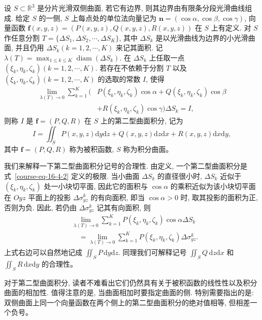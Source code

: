 \documentclass[12pt,fontset=fandol]{ctexart}
\begin{document}
\begin{definition}\label{course-definition-16-4-2}\quad 设 $S\subset\mathbb R^3$ 是分片光滑双侧曲面, 若它有边界, 则其边界由有限条分段光滑曲线组成. 给定 $S$ 的一侧, $S$ 上每点处的单位法向量记为 $\boldsymbol n=(\cos\alpha,\cos\beta,\cos\gamma)$, 向量函数 $\boldsymbol f(x,y,z)=(P(x,y,z),Q(x,y,z),R(x,y,z))$ 在 $S$ 上有定义. 对 $S$ 作任意分割 $T=\{\Delta S_1,\Delta S_2,\cdots,\Delta S_K\}$, 其中 $\Delta S_k$ 是以光滑曲线为边界的小光滑曲面, 并且仍用 $\Delta S_k(k=1,2,\cdots,K)$ 来记其面积. 记 $\lambda(T)=\max_{1\leqslant k\leqslant K}\operatorname{diam}(\Delta S_k)$. 在 $\Delta S_k$ 上任取一点 $(\xi_k,\eta_k,\zeta_k)(k=1,2,\cdots,K)$. 若存在不依赖于分割 $T$ 以及 $(\xi_k,\eta_k,\zeta_k)(k=1,2,\cdots,K)$ 的选取的常数 $I$, 使得
\begin{equation}
\begin{aligned}
  \lim_{\lambda(T)\to0}\sum_{k=1}^K
  (&P(\xi_k,\eta_k,\zeta_k)\cos\alpha
  +Q(\xi_k,\eta_k,\zeta_k)\cos\beta\\
  &+R(\xi_k,\eta_k,\zeta_k)\cos\gamma)\Delta S_k=I,
\end{aligned}
\label{course-eq-16-4-2}
\end{equation}
则称 $I$ 是 $\boldsymbol f=(P,Q,R)$ 在 $S$ 上的第二型曲面积分, 记为
\[
  I=\iint_S P(x,y,z)\mathrm dy\mathrm dz
    +Q(x,y,z)\mathrm dz\mathrm dx
    +R(x,y,z)\mathrm dx\mathrm dy,
\]
其中 $\boldsymbol f=(P,Q,R)$ 称为被积函数, $S$ 称为积分曲面。

\end{definition}
\noindent{}\quad 我们来解释一下第二型曲面积分记号的合理性. 由定义, 一个第二型曲面积分是式~\eqref{course-eq-16-4-2}  定义的极限. 当小曲面 $\Delta S_k$ 的直径很小时, $\Delta S_k$ 近似于 $(\xi_k,\eta_k,\zeta_k)$ 处一小块切平面, 因此它的面积与 $\cos\alpha$ 的乘积近似为该小块切平面在 $Oyz$ 平面上的投影 $\Delta\sigma^k_{yz}$ 的有向面积, 即当 $\cos\alpha>0$ 时, 取其投影的面积为正, 否则为负. 因此, 若仍由 $\Delta\sigma^k_{yz}$ 记其有向面积, 则
\[
\begin{aligned}
  &\lim_{\lambda(T)\to0}\sum_{k=1}^K
    P(\xi_k,\eta_k,\zeta_k)\cos\alpha\Delta S_k\\
  &\quad=\lim_{\lambda(T)\to0}\sum_{k=1}^K
    P(\xi_k,\eta_k,\zeta_k)\Delta\sigma^k_{yz}.
\end{aligned}
\]
上式右边可以自然地记成 $\iint_S P\,\mathrm dy\mathrm dz$. 同理我们可解释记号 $\iint_S Q\,\mathrm dz\mathrm dx$ 和 $\iint_S R\,\mathrm dx\mathrm dy$ 的合理性。

对于第二型曲面积分, 读者不难看出它们仍然具有关于被积函数的线性性以及积分曲面的相加性. 值得注意的是, 当曲面相加时要指定曲面的侧. 特别需要指出的是: 双侧曲面上同一个向量函数在两个侧上的第二型曲面积分的绝对值相等, 但相差一个负号。
\end{document}

